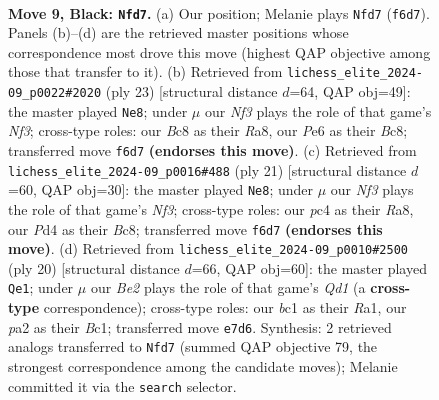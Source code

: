 \documentclass[11pt]{article}
\begin{document}
\clearpage

\begin{figure}[p]\centering
\begin{subfigure}{0.46\textwidth}\centering
\resizebox{\linewidth}{!}{%
\newchessgame
\chessboard[
  setfen={rnbqr1k1/pp2bppp/4pn2/2p5/2Pp2P1/1P3N1B/P2PPPKP/RNBQ1R2 b - - 0 9},
  showmover=false,
  pgfstyle=straightmove, color=movearrow, markmove={f6-d7}
]}
\caption{}
\end{subfigure}\hfill
\begin{subfigure}{0.46\textwidth}\centering
\resizebox{\linewidth}{!}{%
\newchessgame
\chessboard[
  setfen={r1bq1rk1/pp2bppp/5n2/2p1p3/3pP3/3P2P1/PPP1NPBP/R1BQ1RK1 b - - 1 12},
  showmover=false,
  pgfstyle=straightmove, color=movearrow, markmove={f6-e8}
]}
\caption{}
\end{subfigure}
\\[4pt]
\begin{subfigure}{0.46\textwidth}\centering
\resizebox{\linewidth}{!}{%
\newchessgame
\chessboard[
  setfen={r1bq1rk1/pp2bppp/3p1n2/2p1p3/2P1P3/P1NP4/1PQ1BPPP/R1B2RK1 b - - 0 11},
  showmover=false,
  pgfstyle=straightmove, color=movearrow, markmove={f6-e8}
]}
\caption{}
\end{subfigure}\hfill
\begin{subfigure}{0.46\textwidth}\centering
\resizebox{\linewidth}{!}{%
\newchessgame
\chessboard[
  setfen={r1bq1rk1/4ppbp/p1np1np1/1p6/4PP2/2NB1N2/PPP3PP/R1BQ1R1K w - - 0 11},
  showmover=false,
  pgfstyle=straightmove, color=movearrow, markmove={d1-e1}
]}
\caption{}
\end{subfigure}
\caption{\textbf{Move 9, Black: \texttt{Nfd7}.} (a) Our position; Melanie plays \texttt{Nfd7} (\texttt{f6d7}). Panels (b)--(d) are the retrieved master positions whose correspondence most drove this move (highest QAP objective among those that transfer to it). (b) Retrieved from \texttt{lichess\_elite\_2024-09\_p0022\#2020} (ply 23) [structural distance $d$=64, QAP obj=49]: the master played \texttt{Ne8}; under $\mu$ our \emph{Nf3} plays the role of that game's \emph{Nf3}; cross-type roles: our \emph{B}c8 as their \emph{R}a8, our \emph{P}e6 as their \emph{B}c8; transferred move \texttt{f6d7} \textbf{(endorses this move)}. (c) Retrieved from \texttt{lichess\_elite\_2024-09\_p0016\#488} (ply 21) [structural distance $d$=60, QAP obj=30]: the master played \texttt{Ne8}; under $\mu$ our \emph{Nf3} plays the role of that game's \emph{Nf3}; cross-type roles: our \emph{p}c4 as their \emph{R}a8, our \emph{P}d4 as their \emph{B}c8; transferred move \texttt{f6d7} \textbf{(endorses this move)}. (d) Retrieved from \texttt{lichess\_elite\_2024-09\_p0010\#2500} (ply 20) [structural distance $d$=66, QAP obj=60]: the master played \texttt{Qe1}; under $\mu$ our \emph{Be2} plays the role of that game's \emph{Qd1} (a \textbf{cross-type} correspondence); cross-type roles: our \emph{b}c1 as their \emph{R}a1, our \emph{p}a2 as their \emph{B}c1; transferred move \texttt{e7d6}. Synthesis: 2 retrieved analogs transferred to \texttt{Nfd7} (summed QAP objective 79, the strongest correspondence among the candidate moves); Melanie committed it via the \texttt{search} selector.}
\label{fig:thought-m17}
\end{figure}
\end{document}
